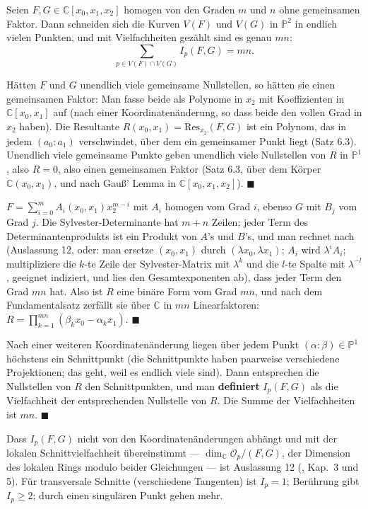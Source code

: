 \begin{merksatz}
Seien $F, G\in\mathbb C[x_0, x_1, x_2]$ homogen von den Graden $m$ und $n$ ohne gemeinsamen Faktor. Dann schneiden sich die Kurven $V(F)$ und $V(G)$ in $\mathbb P^{2}$ in endlich vielen Punkten, und mit Vielfachheiten gezählt sind es genau $mn$:
\[ \sum_{p\in V(F)\cap V(G)} I_p(F, G) = mn . \]

Hätten $F$ und $G$ unendlich viele gemeinsame Nullstellen, so hätten sie einen gemeinsamen Faktor: Man fasse beide als Polynome in $x_2$ mit Koeffizienten in $\mathbb C[x_0, x_1]$ auf (nach einer Koordinatenänderung, so dass beide den vollen Grad in $x_2$ haben). Die Resultante $R(x_0, x_1) = \mathrm{Res}_{x_2}(F, G)$ ist ein Polynom, das in jedem $(a_0 : a_1)$ verschwindet, über dem ein gemeinsamer Punkt liegt (Satz 6.3). Unendlich viele gemeinsame Punkte geben unendlich viele Nullstellen von $R$ in $\mathbb P^{1}$, also $R = 0$, also einen gemeinsamen Faktor (Satz 6.3, über dem Körper $\mathbb C(x_0, x_1)$, und nach Gauß' Lemma in $\mathbb C[x_0, x_1, x_2]$). $\blacksquare$

$F = \sum_{i=0}^{m}A_i(x_0, x_1)x_2^{m-i}$ mit $A_i$ homogen vom Grad $i$, ebenso $G$ mit $B_j$ vom Grad $j$. Die Sylvester-Determinante hat $m + n$ Zeilen; jeder Term des Determinantenprodukts ist ein Produkt von $A$'s und $B$'s, und man rechnet nach (Auslassung 12, oder: man ersetze $(x_0, x_1)$ durch $(\lambda x_0, \lambda x_1)$; $A_i$ wird $\lambda^{i}A_i$; multipliziere die $k$-te Zeile der Sylvester-Matrix mit $\lambda^{k}$ und die $l$-te Spalte mit $\lambda^{-l}$, geeignet indiziert, und lies den Gesamtexponenten ab), dass jeder Term den Grad $mn$ hat. Also ist $R$ eine binäre Form vom Grad $mn$, und nach dem Fundamentalsatz zerfällt sie über $\mathbb C$ in $mn$ Linearfaktoren: $R = \prod_{k=1}^{mn}(\beta_kx_0 - \alpha_kx_1)$. $\blacksquare$

Nach einer weiteren Koordinatenänderung liegen über jedem Punkt $(\alpha : \beta)\in\mathbb P^{1}$ höchstens ein Schnittpunkt (die Schnittpunkte haben paarweise verschiedene Projektionen; das geht, weil es endlich viele sind). Dann entsprechen die Nullstellen von $R$ den Schnittpunkten, und man \textbf{definiert} $I_p(F, G)$ als die Vielfachheit der entsprechenden Nullstelle von $R$. Die Summe der Vielfachheiten ist $mn$. $\blacksquare$

Dass $I_p(F, G)$ nicht von den Koordinatenänderungen abhängt und mit der lokalen Schnittvielfachheit übereinstimmt --- $\dim_{\mathbb C}\mathcal O_p/(F, G)$, der Dimension des lokalen Rings modulo beider Gleichungen --- ist Auslassung 12 (, Kap.~3 und 5). Für transversale Schnitte (verschiedene Tangenten) ist $I_p = 1$; Berührung gibt $I_p\ge2$; durch einen singulären Punkt gehen mehr.


\end{merksatz}
